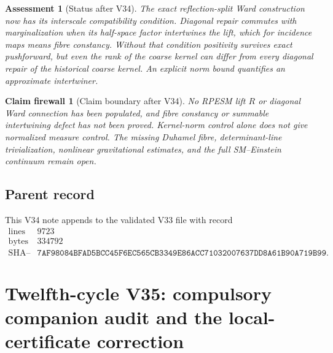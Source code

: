 \documentclass[11pt]{article}
\newtheorem{firewall}[theorem]{Claim firewall}
\newtheorem{assessment}[theorem]{Assessment}
\theoremstyle{remark}
\begin{document}
\begin{assessment}[Status after V34]
\label{ass:v12v34-status}
The exact reflection-split Ward construction now has its interscale
compatibility condition.  Diagonal repair commutes with
marginalization when its half-space factor intertwines the lift,
which for incidence maps means fibre constancy.  Without that
condition positivity survives exact pushforward, but even the rank
of the coarse kernel can differ from every diagonal repair of the
historical coarse kernel.  An explicit norm bound quantifies an
approximate intertwiner.
\end{assessment}

\begin{firewall}[Claim boundary after V34]
\label{fire:v12v34-claim}
No RPESM lift \(R\) or diagonal Ward connection has been populated,
and fibre constancy or summable intertwining defect has not been
proved.  Kernel-norm control alone does not give normalized measure
control.  The missing Duhamel fibre, determinant-line
trivialization, nonlinear gravitational estimates, and the full
SM--Einstein continuum remain open.
\end{firewall}

\subsection{Parent record}

This V34 note appends to the validated V33 file with record
\[
\begin{array}{c|c}
\text{lines}&9723\\
\text{bytes}&334792\\
\text{SHA--256}&
\texttt{7AF98084BFAD5BCC45F6EC565CB3349E86ACC71032007637DD8A61B90A719B99}.
\end{array}
\]


\section{Twelfth-cycle V35: compulsory companion audit and the
local-certificate correction}
\label{sec:v12v35}
\end{document}
